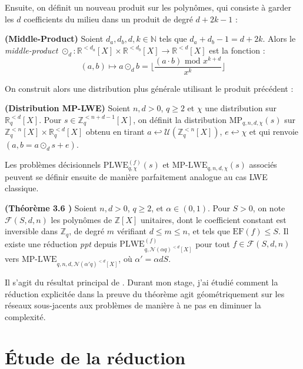 \documentclass[11pt,a4paper]{article}
\begin{document}
Ensuite, on définit un nouveau produit sur les polynômes, qui consiste à garder les $d$ coefficients du milieu dans un produit de degré $d+2k-1$ : 
\begin{defin}\textbf{(Middle-Product)}
Soient $d_a,d_b,d,k \in \mathbb{N}$ tels que $d_a+d_b-1=d+2k$. Alors le \textit{middle-product} $\odot_d : \mathbb{R}^{<d_a}[X]\times\mathbb{R}^{<d_b}[X]\to\mathbb{R}^{<d}[X]$ est la fonction :
\[(a,b) \mapsto a \odot_d b = \lfloor \frac{(a\cdot b)\text{ mod }x^{k+d}}{x^k} \rfloor\]
\end{defin}
On construit alors une distribution plus générale utilisant le produit précédent : 
\begin{defin}\textbf{(Distribution MP-LWE)}
Soient $n,d >0$, $q\geq 2$ et $\chi$ une distribution sur $\mathbb{R}_q^{<d}[X]$. Pour $s\in \mathbb{Z}_q^{<n+d-1}[X]$, on définit la distribution $\text{MP}_{q,n,d,\chi}(s)$ sur $\mathbb{Z}_q^{<n}[X]\times\mathbb{R}_q^{<d}[X]$ obtenu en tirant $a \hookleftarrow \mathcal{U}(\mathbb{Z}_q^{<n}[X])$, $e\hookleftarrow \chi$ et qui renvoie $(a,b=a\odot_d s+e)$. 
\end{defin}

Les problèmes décisionnels $\text{PLWE}^{(f)}_{q,\chi}(s)$ et $\text{MP-LWE}_{q,n,d,\chi}(s)$ associés peuvent se définir ensuite de manière parfaitement analogue au cas LWE classique. \\

\begin{theorem}\textbf{(Théorème 3.6 \cite{mplwe})}
Soient $n,d >0$, $q\geq 2$, et $\alpha \in (0,1)$. Pour $S>0$, on note $\mathcal{F}(S,d,n)$ les polynômes de $\mathbb{Z}[X]$ unitaires, dont le coefficient constant est inversible dans $\mathbb{Z}_q$, de degré $m$ vérifiant $d\leq m\leq n$, et tels que $\text{EF}(f)\leq S$. Il existe une réduction \textit{ppt} depuis $\text{PLWE}^{(f)}_{q,\mathcal{N}(\alpha q)^{<d}[X]}$ pour tout $f\in\mathcal{F}(S,d,n)$ vers  $\text{MP-LWE}_{q,n,d,\mathcal{N}(\alpha' q)^{<d}[X]}$, où $\alpha' = \alpha d S$.
\end{theorem}

Il s'agit du résultat principal de \cite{mplwe}. Durant mon stage, j'ai étudié comment la réduction explicitée dans la preuve du théorème agit géométriquement sur les réseaux sous-jacents aux problèmes de manière à ne pas en diminuer 	la complexité.

\section{Étude de la réduction}
\end{document}
